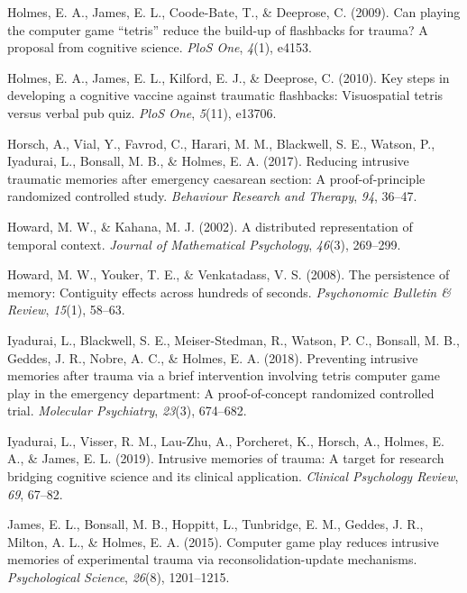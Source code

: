 \documentclass[
  man,
  floatsintext,
  longtable,
  nolmodern,
  notxfonts,
  notimes,
  draftfirst,
  colorlinks=true,linkcolor=blue,citecolor=blue,urlcolor=blue]{apa7}
\newlength{\cslhangindent}
\newenvironment{CSLReferences}[2] %
 {\begin{list}{}{%
  \setlength{\itemindent}{0pt}
  \setlength{\leftmargin}{0pt}
  \setlength{\parsep}{0pt}
  \ifodd #1
   \setlength{\leftmargin}{\cslhangindent}
   \setlength{\itemindent}{-1\cslhangindent}
  \fi
  \setlength{\itemsep}{#2\baselineskip}}}
 {\end{list}}
\begin{document}
\begin{CSLReferences}{1}{0}
Holmes, E. A., James, E. L., Coode-Bate, T., \& Deeprose, C. (2009). Can
playing the computer game {``tetris''} reduce the build-up of flashbacks
for trauma? A proposal from cognitive science. \emph{PloS One},
\emph{4}(1), e4153.

Holmes, E. A., James, E. L., Kilford, E. J., \& Deeprose, C. (2010). Key
steps in developing a cognitive vaccine against traumatic flashbacks:
Visuospatial tetris versus verbal pub quiz. \emph{PloS One},
\emph{5}(11), e13706.

Horsch, A., Vial, Y., Favrod, C., Harari, M. M., Blackwell, S. E.,
Watson, P., Iyadurai, L., Bonsall, M. B., \& Holmes, E. A. (2017).
Reducing intrusive traumatic memories after emergency caesarean section:
A proof-of-principle randomized controlled study. \emph{Behaviour
Research and Therapy}, \emph{94}, 36--47.

Howard, M. W., \& Kahana, M. J. (2002). A distributed representation of
temporal context. \emph{Journal of Mathematical Psychology},
\emph{46}(3), 269--299.

Howard, M. W., Youker, T. E., \& Venkatadass, V. S. (2008). The
persistence of memory: Contiguity effects across hundreds of seconds.
\emph{Psychonomic Bulletin \& Review}, \emph{15}(1), 58--63.

Iyadurai, L., Blackwell, S. E., Meiser-Stedman, R., Watson, P. C.,
Bonsall, M. B., Geddes, J. R., Nobre, A. C., \& Holmes, E. A. (2018).
Preventing intrusive memories after trauma via a brief intervention
involving tetris computer game play in the emergency department: A
proof-of-concept randomized controlled trial. \emph{Molecular
Psychiatry}, \emph{23}(3), 674--682.

Iyadurai, L., Visser, R. M., Lau-Zhu, A., Porcheret, K., Horsch, A.,
Holmes, E. A., \& James, E. L. (2019). Intrusive memories of trauma: A
target for research bridging cognitive science and its clinical
application. \emph{Clinical Psychology Review}, \emph{69}, 67--82.

James, E. L., Bonsall, M. B., Hoppitt, L., Tunbridge, E. M., Geddes, J.
R., Milton, A. L., \& Holmes, E. A. (2015). Computer game play reduces
intrusive memories of experimental trauma via reconsolidation-update
mechanisms. \emph{Psychological Science}, \emph{26}(8), 1201--1215.


\end{CSLReferences}
\end{document}

